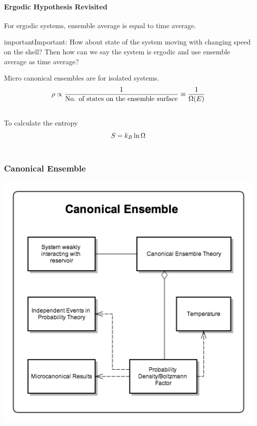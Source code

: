 \documentclass[letterpaper,10pt,english]{sphinxmanual}
\begin{document}
\paragraph{Ergodic Hypothesis Revisited}
\label{equilibrium/week5:ergodic-hypothesis-revisited}
For ergodic systems, ensemble average is equal to time average.

\begin{notice}{important}{Important:}
How about state of the system moving with changing speed on the shell? Then how can we say the system is ergodic and use ensemble average as time average?
\end{notice}

Micro canonical ensembles are for isolated systems.
\begin{gather}
\begin{split}\rho \propto \frac{1}{\text{No. of states on the ensemble surface}} \equiv \frac{1}{\Omega (E)}\end{split}\notag\\\begin{split}\end{split}\notag
\end{gather}
To calculate the entropy
\begin{gather}
\begin{split}S = k_B \ln \Omega\end{split}\notag\\\begin{split}\end{split}\notag
\end{gather}

\subsubsection{Canonical Ensemble}
\label{equilibrium/week5:canonical-ensemble}\label{equilibrium/week5:index-2}
{\hfill\includegraphics{canonicalEnsemble.png}\hfill}
\end{document}
